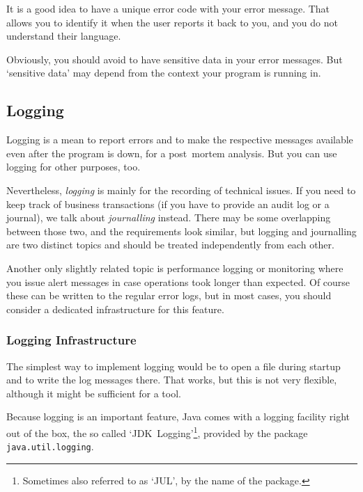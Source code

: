 It is a good idea to have a unique error code with your error message. That allows you to identify it when the user reports it back to you, and you do not understand their language. 

Obviously, you should avoid to have sensitive data in your error messages. But ‘sensitive data’ may depend from the context your program is running in.


\subsection{Logging}\label{sec:Logging}
Logging is a mean to report errors and to make the respective messages available even after the program is down, for a post~mortem analysis. But you can use logging for other purposes, too.

Nevertheless, \textit{logging} is mainly for the recording of technical issues. If you need to keep track of business transactions (if you have to provide an audit log or a journal), we talk about \textit{journalling} instead. There may be some overlapping between those two, and the requirements look similar, but logging and journalling are two distinct topics and should be treated independently from each other.

Another only slightly related topic is performance logging or monitoring where you issue alert messages in case operations took longer than expected. Of course these can be written to the regular error logs, but in most cases, you should consider a dedicated infrastructure for this feature.


\subsubsection{Logging Infrastructure}
The simplest way to implement logging would be to open a file during startup and to write the log messages there. That works, but this is not very flexible, although it might be sufficient for a tool.

Because logging is an important feature, Java comes with a logging facility right out of the box, the so called ‘JDK~Logging’\footnote{Sometimes also referred to as ‘JUL’, by the name of the package.}, provided by the package \lstinline|java.util.logging|\autocite{ORACLE_DOC_LOGGING_PACKAGE, ORACLE_DOC_LOGGING_OVERVIEW}.

